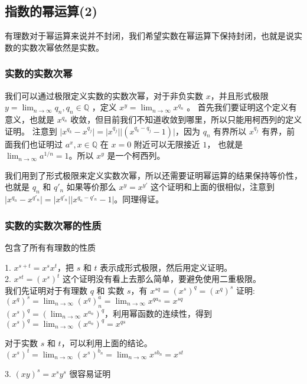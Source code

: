 \subsection{指数的幂运算(2)}

有理数对于幂运算来说并不封闭，我们希望实数在幂运算下保持封闭，也就是说实数的实数次幂依然是实数。

\subsubsection{实数的实数次幂}

我们可以通过极限定义实数的实数次幂，对于非负实数 $x$，并且形式极限 $y = \lim_{n \to \infty }q_n, q_n \in \mathbb{Q}$ ，定义 $x^y = \lim_{n \to \infty} x^{q_n}$ 。
首先我们要证明这个定义有意义，也就是 $x^{q_n}$ 收敛，但目前我们不知道收敛到哪里，所以只能用柯西列的定义证明。
注意到 $\lvert x^{q_k} - x^{q_j} \rvert = \lvert x^{q_j} \rvert \lvert (x^{q_k-q_j}-1) \rvert$，因为 $q_n$ 有界所以 $x^{q_j}$ 有界，前面我们也证明过 $a^x, x \in \mathbb{Q} $ 在 $x = 0$
附近可以无限接近 $1$， 也就是 $\lim_{n \to \infty} a^{1/n} = 1$。所以 $x^y$ 是一个柯西列。

我们用到了形式极限来定义实数次幂，所以还需要证明幂运算的结果保持等价性，也就是 $q_n$ 和  $q'_n$ 如果等价那么 $x^y = x^{y'}$
这个证明和上面的很相似，注意到$ \lvert x^{q_n} -x ^{q'_n} \rvert = \lvert x^{q'_n} \rvert \lvert x^{q_n -q'_n}-1\rvert$。同理得证。

\subsubsection{实数的实数次幂的性质}

包含了所有有理数的性质

1. $x^{s+t} = x^sx^t$，把 $s$ 和 $t$ 表示成形式极限，然后用定义证明。\\

2. $x^{st} = (x^s)^t $ 这个证明没有看上去那么简单，要避免使用二重极限。 \\
我们先证明对于有理数 $q$ 和 实数 $s$，有 $x^{sq} = (x^s)^q = (x^q)^s$
证明: $(x^q)^s = \lim_{n \to \infty} (x^q)^a_n = \lim_{n \to \infty} x^{qa_n} = x^{sq} $ \\
$(x^s)^q = (\lim_{n \to \infty}x^{a_n})^q$，利用幂函数的连续性，得到 $(x^s)^q = \lim_{n \to \infty}(x^{a_n})^q = x^{qs}$

对于实数 $s$ 和 $t$，可以利用上面的结论。$(x^{s})^{t} = \lim_{n \to \infty}(x^s)^{b_n} = \lim_{n \to \infty}x^{s b_n} = x^{st}$

3. $(xy)^s = x^sy^s$ 很容易证明

